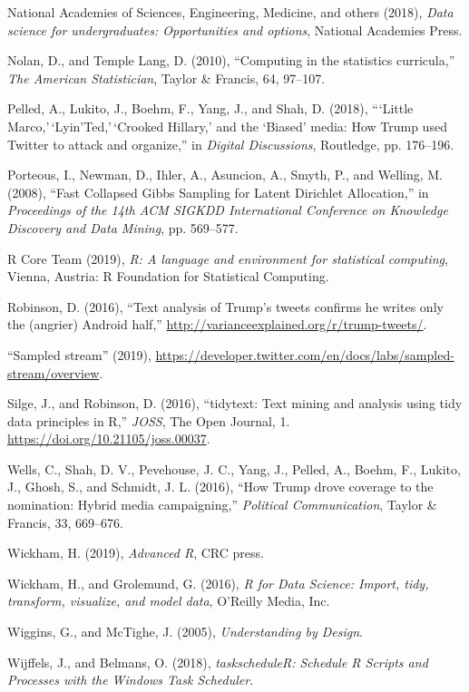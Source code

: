 \documentclass[
]{article}
\newlength{\cslhangindent}
\newenvironment{cslreferences}%
  {\setlength{\parindent}{0pt}%
  \everypar{\setlength{\hangindent}{\cslhangindent}}\ignorespaces}%
  {\par}
\begin{document}
\begin{cslreferences}
\leavevmode\hypertarget{ref-national2018data}{}%
National Academies of Sciences, Engineering, Medicine, and others (2018), \emph{Data science for undergraduates: Opportunities and options}, National Academies Press.

\leavevmode\hypertarget{ref-nolan2010computing}{}%
Nolan, D., and Temple Lang, D. (2010), ``Computing in the statistics curricula,'' \emph{The American Statistician}, Taylor \& Francis, 64, 97--107.

\leavevmode\hypertarget{ref-pelled2018little}{}%
Pelled, A., Lukito, J., Boehm, F., Yang, J., and Shah, D. (2018), ```Little Marco,'\,`Lyin'Ted,'\,`Crooked Hillary,' and the `Biased' media: How Trump used Twitter to attack and organize,'' in \emph{Digital Discussions}, Routledge, pp. 176--196.

\leavevmode\hypertarget{ref-porteous2008fast}{}%
Porteous, I., Newman, D., Ihler, A., Asuncion, A., Smyth, P., and Welling, M. (2008), ``Fast Collapsed Gibbs Sampling for Latent Dirichlet Allocation,'' in \emph{Proceedings of the 14th ACM SIGKDD International Conference on Knowledge Discovery and Data Mining}, pp. 569--577.

\leavevmode\hypertarget{ref-r}{}%
R Core Team (2019), \emph{R: A language and environment for statistical computing}, Vienna, Austria: R Foundation for Statistical Computing.

\leavevmode\hypertarget{ref-drob}{}%
Robinson, D. (2016), ``Text analysis of Trump's tweets confirms he writes only the (angrier) Android half,'' \url{http://varianceexplained.org/r/trump-tweets/}.

\leavevmode\hypertarget{ref-tweet_stream}{}%
``Sampled stream'' (2019), \url{https://developer.twitter.com/en/docs/labs/sampled-stream/overview}.

\leavevmode\hypertarget{ref-tidytext}{}%
Silge, J., and Robinson, D. (2016), ``tidytext: Text mining and analysis using tidy data principles in R,'' \emph{JOSS}, The Open Journal, 1. \url{https://doi.org/10.21105/joss.00037}.

\leavevmode\hypertarget{ref-wells2016trump}{}%
Wells, C., Shah, D. V., Pevehouse, J. C., Yang, J., Pelled, A., Boehm, F., Lukito, J., Ghosh, S., and Schmidt, J. L. (2016), ``How Trump drove coverage to the nomination: Hybrid media campaigning,'' \emph{Political Communication}, Taylor \& Francis, 33, 669--676.

\leavevmode\hypertarget{ref-wickham2019advanced}{}%
Wickham, H. (2019), \emph{Advanced R}, CRC press.

\leavevmode\hypertarget{ref-wickham2016r}{}%
Wickham, H., and Grolemund, G. (2016), \emph{R for Data Science: Import, tidy, transform, visualize, and model data}, O'Reilly Media, Inc.

\leavevmode\hypertarget{ref-wiggins2005understanding}{}%
Wiggins, G., and McTighe, J. (2005), \emph{Understanding by Design}.

\leavevmode\hypertarget{ref-taskscheduleR}{}%
Wijffels, J., and Belmans, O. (2018), \emph{taskscheduleR: Schedule R Scripts and Processes with the Windows Task Scheduler}.
\end{cslreferences}
\end{document}
